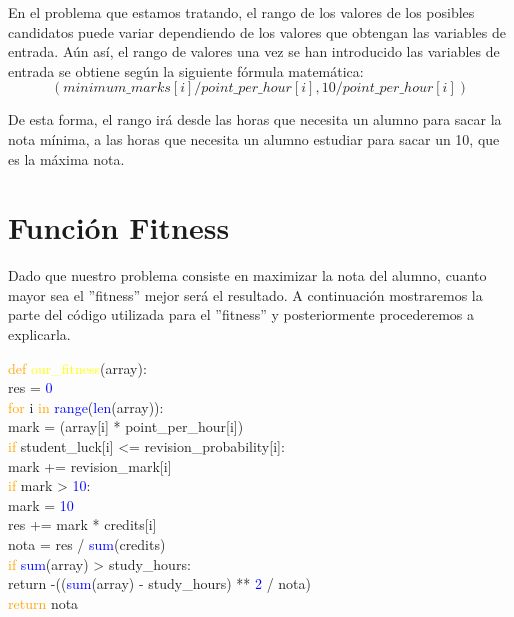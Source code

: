 \documentclass[11pt, a4paper, titlepage]{article}
\begin{document}
En el problema que estamos tratando, el rango de los valores de los posibles candidatos puede variar dependiendo de los valores que obtengan las variables de entrada. Aún así, el rango de valores una vez se han introducido las variables de entrada se obtiene según la siguiente fórmula matemática:
\[
(minimum\_marks[i] / point\_per\_hour[i], 10 / point\_per\_hour[i])
\]

De esta forma, el rango irá desde las horas que necesita un alumno para sacar la nota mínima, a las horas que necesita un alumno estudiar para sacar un 10, que es la máxima nota.

\newpage

\section{Función Fitness}
Dado que nuestro problema consiste en maximizar la nota del alumno, cuanto mayor sea el ''fitness'' mejor será el resultado. A continuación mostraremos la parte del código utilizada para el ''fitness'' y posteriormente procederemos a explicarla.

\vspace{5mm}

\textcolor{orange}{def} \textcolor{yellow}{our\_fitness}(array):\\\hspace*{1em} res = \textcolor{blue}{0}\\
\hspace*{1em} \textcolor{orange}{for} i \textcolor{orange}{in} \textcolor{blue}{range}(\textcolor{blue}{len}(array)):\\
\hspace*{2em} mark = (array[i] * point\_per\_hour[i])\\
\hspace*{2em} \textcolor{orange}{if} student\_luck[i] <= revision\_probability[i]:\\
\hspace*{3em} mark += revision\_mark[i]\\
\hspace*{2em} \textcolor{orange}{if} mark > \textcolor{blue}{10}:\\
\hspace*{3em} mark = \textcolor{blue}{10}\\
\hspace*{2em} res += mark * credits[i]\\
\hspace*{1em} nota = res / \textcolor{blue}{sum}(credits)\\
\hspace*{1em} \textcolor{orange}{if} \textcolor{blue}{sum}(array) > study\_hours:\\
\hspace*{2em} return -((\textcolor{blue}{sum}(array) - study\_hours) ** \textcolor{blue}{2} / nota)\\
\hspace*{1em} \textcolor{orange}{return} nota\\
\end{document}
